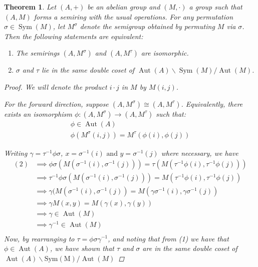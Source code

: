 \documentclass{article}
\newtheorem{theorem}{Theorem}
\begin{document}
\begin{theorem}
    Let \((A, +)\) be an abelian group and \((M, \cdot)\) a group such that \((A, M)\) forms a semiring with the usual operations. For any permutation \(\sigma \in \operatorname{Sym}(M)\), let \(M^\sigma\) denote the semigroup obtained by permuting \(M\) via \(\sigma\). Then the following statements are equivalent:
    \begin{enumerate}
        \item The semirings \((A, M^\sigma)\) and \((A, M^\tau)\) are isomorphic.
        \item \(\sigma\) and \(\tau\) lie in the same double coset of \(\operatorname{Aut}(A) \backslash \operatorname{Sym}(M) / \operatorname{Aut}(M)\).
    \end{enumerate}
\begin{proof}
    We will denote the product \(i\cdot j\) in \(M\) by \(M(i,j)\).

    For the forward direction, suppose \((A, M^\sigma) \cong (A, M^\tau)\). Equivalently, there exists an isomorphism \(\phi: (A, M^\sigma) \to (A, M^\tau)\) such that:
    \begin{gather}
         \phi \in \operatorname{Aut}(A)\\
         \phi(M^\sigma(i,j)) = M^\tau(\phi(i),\phi(j))
    \end{gather}

    Writing \(\gamma = \tau^{-1}\phi\sigma\), \(x = \sigma^{-1}(i)\text{ and } y = \sigma^{-1}(j)\) where necessary, we have
    \begin{align*}
        (2) &\implies \phi\sigma(M(\sigma^{-1}(i), \sigma^{-1}(j))) = \tau(M(\tau^{-1}\phi(i), \tau^{-1}\phi(j))) \\
        &\implies \tau^{-1}\phi\sigma(M(\sigma^{-1}(i),\sigma^{-1}(j))) = M(\tau^{-1}\phi(i), \tau^{-1}\phi(j))\\
        &\implies \gamma(M(\sigma^{-1}(i), \sigma^{-1}(j)) = M(\gamma\sigma^{-1}(i), \gamma\sigma^{-1}(j))  \\
        &\implies \gamma M(x,y)=M(\gamma(x), \gamma(y))\\
        &\implies \gamma\in\operatorname{Aut}(M)\\
        &\implies \gamma^{-1}\in\operatorname{Aut}(M)\\
    \end{align*}
    Now, by rearranging to \(\tau = \phi\sigma\gamma^{-1}\), and noting that from (1) we have that \(\phi\in\operatorname{Aut}(A)\), we have shown that \(\tau\) and \(\sigma\) are in the same double coset of \(\operatorname{Aut}(A)\backslash\operatorname{Sym(M)}/\operatorname{Aut}(M)\)


\end{proof}
\end{theorem}
\end{document}
